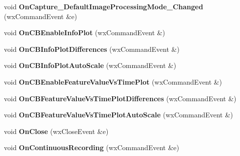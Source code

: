 \begin{DoxyCompactItemize}
\item 
\hypertarget{class_prop_view_frame_a46c2c81ea8194bdbfcd00633d6d7b8b6}{void {\bfseries On\+Capture\+\_\+\+Default\+Image\+Processing\+Mode\+\_\+\+Changed} (wx\+Command\+Event \&e)}\label{class_prop_view_frame_a46c2c81ea8194bdbfcd00633d6d7b8b6}

\item 
\hypertarget{class_prop_view_frame_a7e4bdc5e5f43269a8fd7bbc0cd7919d9}{void {\bfseries On\+C\+B\+Enable\+Info\+Plot} (wx\+Command\+Event \&)}\label{class_prop_view_frame_a7e4bdc5e5f43269a8fd7bbc0cd7919d9}

\item 
\hypertarget{class_prop_view_frame_a3b40d5847e051c2002bc7bc30f14eafd}{void {\bfseries On\+C\+B\+Info\+Plot\+Differences} (wx\+Command\+Event \&)}\label{class_prop_view_frame_a3b40d5847e051c2002bc7bc30f14eafd}

\item 
\hypertarget{class_prop_view_frame_a22a84b6a905a00fb54877a54ded75c54}{void {\bfseries On\+C\+B\+Info\+Plot\+Auto\+Scale} (wx\+Command\+Event \&)}\label{class_prop_view_frame_a22a84b6a905a00fb54877a54ded75c54}

\item 
\hypertarget{class_prop_view_frame_a4db3f7d90f0d72efe5e8932692cf26dd}{void {\bfseries On\+C\+B\+Enable\+Feature\+Value\+Vs\+Time\+Plot} (wx\+Command\+Event \&)}\label{class_prop_view_frame_a4db3f7d90f0d72efe5e8932692cf26dd}

\item 
\hypertarget{class_prop_view_frame_a7110aa738fce6dc1ad4d002eb6a97249}{void {\bfseries On\+C\+B\+Feature\+Value\+Vs\+Time\+Plot\+Differences} (wx\+Command\+Event \&)}\label{class_prop_view_frame_a7110aa738fce6dc1ad4d002eb6a97249}

\item 
\hypertarget{class_prop_view_frame_ab5e190b068cba52e0675e8d3ae52f22a}{void {\bfseries On\+C\+B\+Feature\+Value\+Vs\+Time\+Plot\+Auto\+Scale} (wx\+Command\+Event \&)}\label{class_prop_view_frame_ab5e190b068cba52e0675e8d3ae52f22a}

\item 
\hypertarget{class_prop_view_frame_a808e4a085510c8ee83183dbc55af23cd}{void {\bfseries On\+Close} (wx\+Close\+Event \&e)}\label{class_prop_view_frame_a808e4a085510c8ee83183dbc55af23cd}

\item 
\hypertarget{class_prop_view_frame_aa770cfe812af534de15f465eb3fcc063}{void {\bfseries On\+Continuous\+Recording} (wx\+Command\+Event \&e)}\label{class_prop_view_frame_aa770cfe812af534de15f465eb3fcc063}


\end{DoxyCompactItemize}
